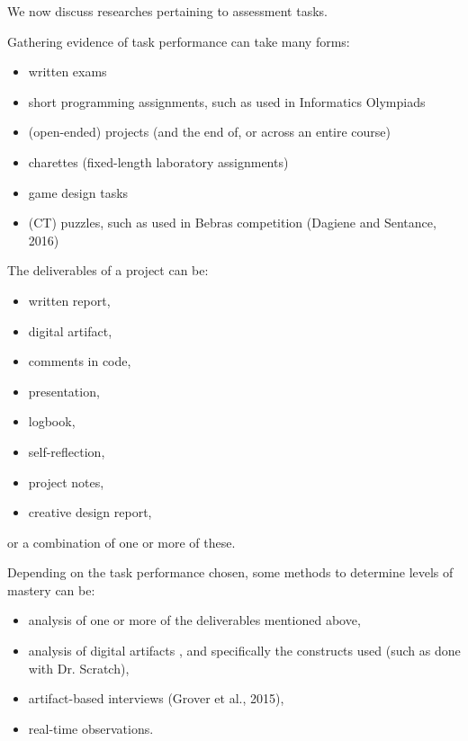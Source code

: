 We now discuss researches pertaining to assessment tasks.


Gathering evidence of task performance can take many forms:
\begin{itemize}
\item written exams
\item short programming assignments, such as used in Informatics Olympiads \cite{Lonati2017Bebras}
\item (open-ended) projects (and the end of, or across an entire course)
\item charettes (fixed-length laboratory assignments)
\item game design tasks \cite{snow2017CTECD}
\item (CT) puzzles, such as used in Bebras competition (Dagiene and Sentance, 2016)

\end{itemize}


The deliverables of a project can be:
\begin{itemize}
\item written report,
\item digital artifact,
\item comments in code,
\item presentation,
\item logbook,
\item self-reflection,
\item project notes,
\item creative design report,
\end{itemize}
or a combination of one or more of these.


Depending on the task performance chosen, some methods to determine levels of mastery can be:
\begin{itemize}
\item analysis of one or more of the deliverables mentioned above, 
\item analysis of digital artifacts \cite{BrennanResnick2012} , and specifically the constructs used (such as done with Dr. Scratch),
\item artifact-based interviews (Grover et al., 2015),
\item real-time observations.
\end{itemize}


